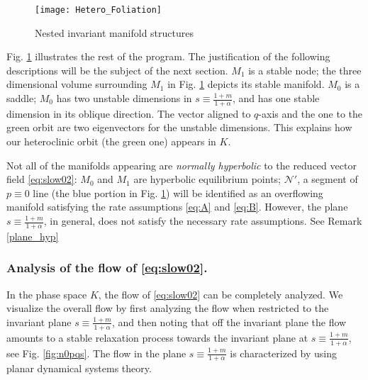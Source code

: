 \documentclass[usletter,11pt]{article}
\theoremstyle{remark}
\begin{document}
\begin{figure}[ht] 
 \centering
 \texttt{[image: Hetero\_Foliation]} 
  \caption{Nested invariant manifold structures} \label{fig:HF} 
\end{figure}
Fig. \ref{fig:HF} illustrates the rest of the program. The justification of the following descriptions will be the subject of the next section. $M_1$ is a stable node; the three dimensional volume surrounding $M_1$ in Fig. \ref{fig:HF} depicts its stable manifold. $M_0$ is a saddle; $M_0$ has two unstable dimensions in $s\equiv\tfrac{1+m}{1+\alpha}$, and has one stable dimension in its oblique direction. The vector aligned to $q$-axis and the one to the green orbit are two eigenvectors for the unstable dimensions. This explains how our heteroclinic orbit (the green one) appears in $K$. %

Not all of the manifolds appearing are {\it normally hyperbolic} to the reduced vector field \eqref{eq:slow02}: $M_0$ and $M_1$ are hyperbolic equilibrium points; $\mathcal{N}'$, a segment of $p\equiv0$ line (the blue portion in Fig. \ref{fig:HF}) will be identified as an overflowing manifold satisfying the rate assumptions \eqref{eq:A} and \eqref{eq:B}. However,
the plane $s\equiv \tfrac{1+m}{1+\alpha}$, in general, does not satisfy the necessary rate assumptions. See Remark \ref{plane_hyp}



\subsubsection{Analysis of the flow of  \eqref{eq:slow02}.}%

In the phase space $K$, the flow of \eqref{eq:slow02} can be completely analyzed. We visualize the overall flow by first analyzing the flow when restricted to the invariant plane $s\equiv\tfrac{1+m}{1+\alpha}$, and then noting that off the invariant plane the flow amounts to a stable  relaxation process towards the invariant plane at
$s\equiv\tfrac{1+m}{1+\alpha}$,  see Fig. \ref{fig:n0pqs}. The flow in the plane $s\equiv\tfrac{1+m}{1+\alpha}$ is characterized by using planar dynamical systems theory.
\end{document}
